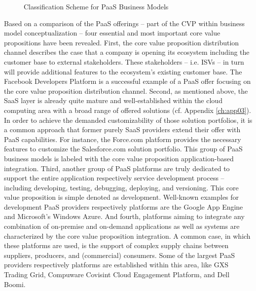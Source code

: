 \begin{figure}[tb]
	\centering
	
	\caption{Classification Scheme for PaaS Business Models}
	\label{fig:cs}
\end{figure}

Based on a comparison of the \ac{PaaS} offerings -- part of the \ac{CVP} within \citet{Johnson2008} business model conceptualization -- four essential and most important core value propositions have been revealed.  First, the core value proposition distribution channel describes the case that a company is opening its ecosystem including the customer base to external stakeholders. These stakeholders -- i.e. \acp{ISV} -- in turn will provide additional features to the ecosystem's existing customer base. The Facebook Developers Platform is a successful example of a \ac{PaaS} offer focusing on the core value proposition distribution channel. Second, as mentioned above, the \ac{SaaS} layer is already quite mature and well-established within the cloud computing area with a broad range of offered solutions (cf. Appendix \ref{ch:app03}). In order to achieve the demanded customizability of those solution portfolios, it is a common approach that former purely \ac{SaaS} providers extend their offer with \ac{PaaS} capabilities. For instance, the Force.com platform provides the necessary features to customize the Salesforce.com solution portfolio. This group of \ac{PaaS} business models is labeled with the core value proposition application-based integration. Third, another group of \ac{PaaS} platforms are truly dedicated to support the entire application respectively service development process -- including developing, testing, debugging, deploying, and versioning. This core value proposition is simple denoted as development. Well-known examples for development \ac{PaaS} providers respectively platforms are the Google App Engine and Microsoft's Windows Azure. And fourth, platforms aiming to integrate any combination of on-premise and on-demand applications as well as systems are characterized by the core value proposition integration. A common case, in which these platforms are used, is the support of complex supply chains between suppliers, producers, and (commercial) consumers. Some of the largest \ac{PaaS} providers respectively platforms are established within this area, like GXS Trading Grid, Compuware Covisint Cloud Engagement Platform, and Dell Boomi.

